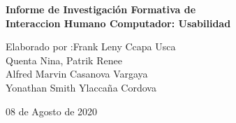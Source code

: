 \documentclass[11pt]{article}
\begin{document}
\begin{mdframed}
\begin{flushleft}
\begin{normalsize}
			\end{normalsize}
		\end{flushleft}
		\doublespacing		
		\begin{center}
			\begin{large}
				\textbf{Informe de Investigación Formativa de \\Interaccion Humano Computador: Usabilidad}
			\end{large}
		\end{center}
		\singlespacing
		\begin{flushleft}
			\begin{normalsize}
				Elaborado por :\qquad Frank Leny Ccapa Usca\\
				\hspace{31.5mm}Quenta Nina, Patrik Renee\\
				\hspace{31.5mm}Alfred Marvin Casanova Vargaya\\
				\hspace{31.5mm}Yonathan Smith Ylaccaña Cordova\\
				
				\vspace{10mm}
			
			\end{normalsize}
		\end{flushleft}
		\vspace{15mm}
		\begin{center}
			08 de Agosto de 2020
		\end{center}
		
	\end{mdframed}
	
	\newpage
	\tableofcontents
	
\end{document}
